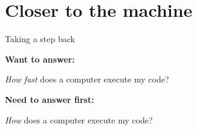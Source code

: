 \documentclass[english,compress]{beamer}
\begin{document}
\section{Closer to the machine}
\begin{frame}{Taking a step back}
  \begin{center}
  \textbf{Want to answer:}

  \emph{How fast} does a computer execute my code?

  \bigskip
  \textbf{Need to answer first:}

  \emph{How} does a computer execute my code?
  \end{center}
\end{frame}
\end{document}

